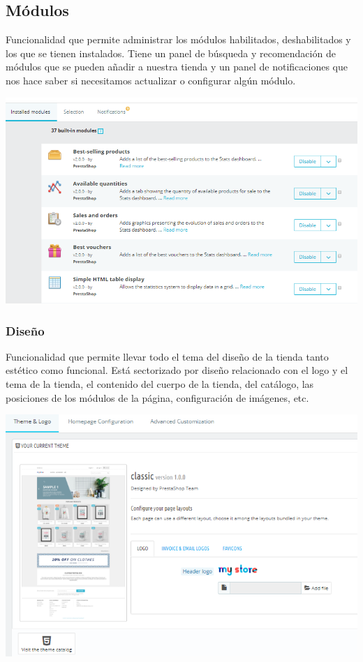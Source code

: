\documentclass{article}
\begin{document}
\subsection{Módulos}

Funcionalidad que permite administrar los módulos habilitados, deshabilitados y los que se tienen instalados. Tiene un panel de búsqueda y recomendación de módulos que se pueden añadir a nuestra tienda y  un panel de notificaciones que nos hace saber si necesitamos actualizar o configurar algún módulo.

\begin{center}
\includegraphics[scale=0.4]{images/modulos.png}
\end{center}

\subsubsection{Diseño}

Funcionalidad que permite llevar todo el tema del diseño de la tienda tanto estético como funcional. Está sectorizado por diseño relacionado con el logo y el tema de la tienda, el contenido del cuerpo de la tienda, del catálogo, las posiciones de los módulos de la página, configuración de imágenes, etc.

\begin{center}
\includegraphics[scale=0.6]{images/diseno.png}
\end{center}
\end{document}
